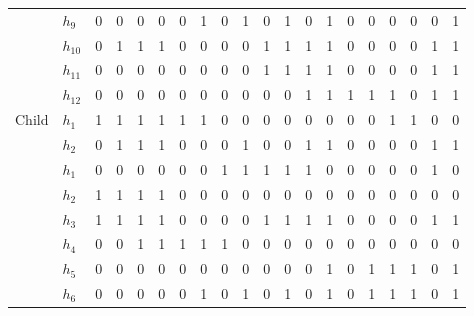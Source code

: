 \begin{table*}[!t]
\begin{adjustbox}{width=0.9\textwidth}
\begin{tabular}{cl|cccc cccc cccc cccc | cc}
				&	$h_9$ & 0  & 0 & 0  & 0  & 0 & 1 & 0 & 1  & 0 & 1	 & 0 & 1  & 0 & 0  & 0 & 0 & 0 & 1\\
				&	$h_{10}$   & 0  & 1 & 1  & 1  & 0 & 0 & 0 & 0  & 1 & 1 & 1 & 1  & 0 & 0  & 0 & 0 & 1 & 1\\
				&	$h_{11}$   & 0  & 0 & 0  & 0  & 0 & 0 & 0 & 0  & 1 & 1 & 1 & 1  & 0 & 0  & 0 & 0 & 1 & 1\\
				&	$h_{12}$   & 0  & 0 & 0  & 0  & 0 & 0 & 0 & 0  & 0 & 0 & 1 & 1  & 1 & 1  & 1 & 0 & 1 & 1\\
			\midrule
			\multirow{8}{*}{Child}	
				   &	$h_1$ & 1  & 1 & 1  & 1  & 1 & 1 & 0 & 0  & 0 & 0 & 0 & 0  & 0 & 0  & 1 & 1 & 0 & 0\\
				&	$h_2$ & 0  & 1 & 1  & 1  & 0 & 0 & 0 & 1  & 0 & 0 & 1 & 1  & 0 & 0  & 0 & 0 & 1 & 1\\
				&	$h_1$ & 0  & 0 & 0  & 0  & 0 & 0 & 1 & 1  & 1 & 1	 & 1 & 0  & 0 & 0  & 0 & 0 & 1 & 0\\
				&	$h_2$ & 1  & 1 & 1  & 1  & 0 & 0 & 0 & 0  & 0 & 0	 & 0 & 0  & 0 & 0  & 0 & 0 & 0 & 0\\
				&	$h_3$ & 1  & 1 & 1  & 1  & 0 & 0 & 0 & 0  & 1 & 1	 & 1 & 1  & 0 & 0  & 0 & 0 & 1 & 1\\
				&	$h_4$ & 0  & 0 & 1  & 1  & 1 & 1 & 1 & 0  & 0 & 0	 & 0 & 0  & 0 & 0  & 0 & 0 & 0 & 0\\
				&	$h_5$ & 0  & 0 & 0  & 0  & 0 & 0 & 0 & 0  & 0 & 0	 & 0 & 1  & 0 & 1  & 1 & 1 & 0 & 1\\
				&	$h_6$ & 0  & 0 & 0  & 0  & 0 & 1 & 0 & 1  & 0 & 1	 & 0 & 1  & 0 & 1  & 1 & 1 & 0 & 1\\
			\bottomrule
			\end{tabular}
		\end{adjustbox}
\end{table*}


